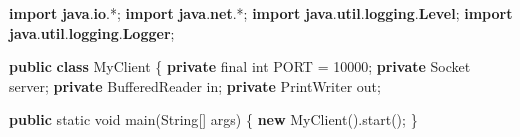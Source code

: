\documentclass[
]{article}
\newenvironment{Shaded}{}{}
\newcommand{\BuiltInTok}[1]{\textcolor[rgb]{0.00,0.50,0.00}{#1}}
\newcommand{\DataTypeTok}[1]{\textcolor[rgb]{0.56,0.13,0.00}{#1}}
\newcommand{\DecValTok}[1]{\textcolor[rgb]{0.25,0.63,0.44}{#1}}
\newcommand{\FunctionTok}[1]{\textcolor[rgb]{0.02,0.16,0.49}{#1}}
\newcommand{\ImportTok}[1]{\textcolor[rgb]{0.00,0.50,0.00}{\textbf{#1}}}
\newcommand{\KeywordTok}[1]{\textcolor[rgb]{0.00,0.44,0.13}{\textbf{#1}}}
\newcommand{\NormalTok}[1]{#1}
\newcommand{\OperatorTok}[1]{\textcolor[rgb]{0.40,0.40,0.40}{#1}}
\begin{document}
\begin{Shaded}
\begin{Highlighting}[]
\KeywordTok{import} \ImportTok{java}\OperatorTok{.}\ImportTok{io}\OperatorTok{.*;}
\KeywordTok{import} \ImportTok{java}\OperatorTok{.}\ImportTok{net}\OperatorTok{.*;}
\KeywordTok{import} \ImportTok{java}\OperatorTok{.}\ImportTok{util}\OperatorTok{.}\ImportTok{logging}\OperatorTok{.}\ImportTok{Level}\OperatorTok{;}
\KeywordTok{import} \ImportTok{java}\OperatorTok{.}\ImportTok{util}\OperatorTok{.}\ImportTok{logging}\OperatorTok{.}\ImportTok{Logger}\OperatorTok{;}

\KeywordTok{public} \KeywordTok{class}\NormalTok{ MyClient }\OperatorTok{\{}
    \KeywordTok{private} \DataTypeTok{final} \DataTypeTok{int}\NormalTok{ PORT }\OperatorTok{=} \DecValTok{10000}\OperatorTok{;}
    \KeywordTok{private} \BuiltInTok{Socket}\NormalTok{ server}\OperatorTok{;}
    \KeywordTok{private} \BuiltInTok{BufferedReader}\NormalTok{ in}\OperatorTok{;}
    \KeywordTok{private} \BuiltInTok{PrintWriter}\NormalTok{ out}\OperatorTok{;}

    \KeywordTok{public} \DataTypeTok{static} \DataTypeTok{void} \FunctionTok{main}\OperatorTok{(}\BuiltInTok{String}\OperatorTok{[]}\NormalTok{ args}\OperatorTok{)} \OperatorTok{\{}
        \KeywordTok{new} \FunctionTok{MyClient}\OperatorTok{().}\FunctionTok{start}\OperatorTok{();}
    \OperatorTok{\}}


\end{Highlighting}
\end{Shaded}
\end{document}
